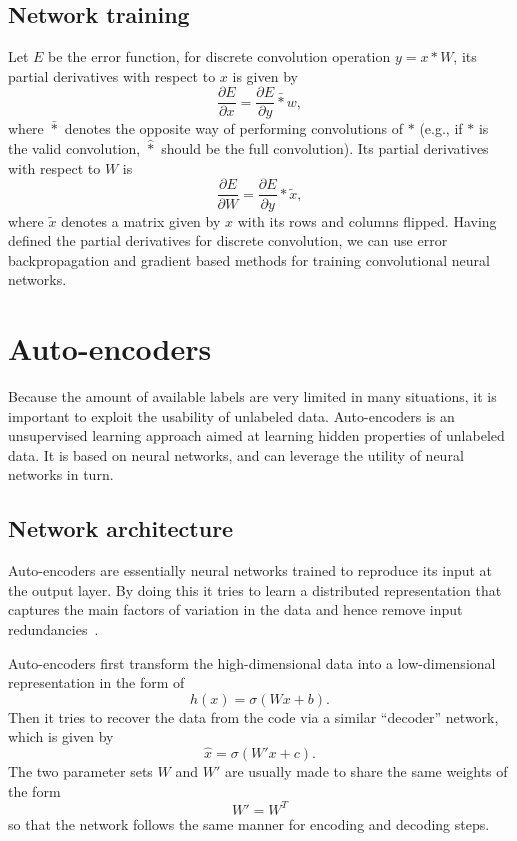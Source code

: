 \subsection{Network training}
\label{sec:CNN training}

Let $E$ be the error function, for discrete convolution operation $y=x\ast W$, its partial derivatives with respect to $x$ is given by 
\begin{equation}
	\frac{\partial E}{\partial x} = \frac{\partial E}{\partial y}\bar{\ast} w, 
\end{equation}
where $\bar{\ast}$ denotes the opposite way of performing convolutions of $*$ (e.g., if $\ast$ is the valid convolution, $\hat{\ast}$ should be the full convolution). Its partial derivatives with respect to $W$ is 
\begin{equation}
	\frac{\partial E}{\partial W}   = \frac{\partial E}{\partial y} \ast\tilde{x},
\end{equation}
where $\tilde{x}$ denotes a matrix given by $x$ with its rows and columns flipped. Having defined the partial derivatives for discrete convolution, we can use error backpropagation and gradient based methods for training convolutional neural networks. 

\section{Auto-encoders}
\label{sec:Auto-encoders}
Because the amount of available labels are very limited in many situations, it is important to exploit the usability of unlabeled data. Auto-encoders is an unsupervised learning approach aimed at learning hidden properties of unlabeled data. It is based on neural networks, and can leverage the utility of neural networks in turn.

\subsection{Network architecture}
\label{Network architectur}
Auto-encoders are essentially neural networks trained to reproduce its input at the output layer. By doing this it tries to learn a distributed representation that captures the main factors of variation in the data and hence remove input redundancies~\cite{bengio2009learning}. 

Auto-encoders first transform the high-dimensional data into a low-dimensional representation in the form of
\begin{equation}
	h(x) = \sigma(Wx+b).
\end{equation}
Then it tries to recover the data from the code via a similar ``decoder'' network, which is given by
\begin{equation}
	\hat{x} = \sigma(W'x+c).
\end{equation}
The two parameter sets $W$ and $W'$ are usually made to share the same weights of the form 
\begin{equation}
	W' = W^T
\end{equation}
so that the network follows the same manner for encoding and decoding steps.

